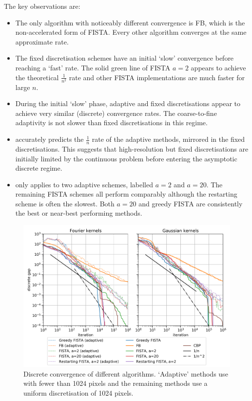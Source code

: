 \documentclass[10pt,a4paper,onecolumn]{article}
\numberwithin{equation}{section}
\begin{document}
The key observations are:
\begin{itemize}
	\item The only algorithm with noticeably different convergence is FB, which is the non-accelerated form of FISTA. Every other algorithm converges at the same approximate rate.
	\item The fixed discretisation schemes have an initial `slow' convergence before reaching a `fast' rate. The solid green line of FISTA $a=2$ appears to achieve the theoretical $\frac1{n^2}$ rate and other FISTA implementations are much faster for large $n$.
	\item During the initial `slow' phase, adaptive and fixed discretisations appear to achieve very similar (discrete) convergence rates. The coarse-to-fine adaptivity is not slower than fixed discretisations in this regime.
	\item {} accurately predicts the $\frac1n$ rate of the adaptive methods, mirrored in the fixed discretisations. This suggests that high-resolution but fixed discretisations are initially limited by the continuous problem before entering the asymptotic discrete regime.
	\item {} only applies to two adaptive schemes, labelled $a=2$ and $a=20$. The remaining FISTA schemes all perform comparably although the restarting scheme is often the slowest. Both $a=20$ and greedy FISTA are consistently the best or near-best performing methods.
\end{itemize}

\begin{figure}[H]\centering
	\includegraphics[width=.84\textwidth]{lasso_convergence}
	\caption{Discrete convergence of different algorithms. `Adaptive' methods use  with fewer than 1024 pixels and the remaining methods use a uniform discretisation of 1024 pixels.}\label{fig:ca: convergence with method}
\end{figure}
\end{document}
